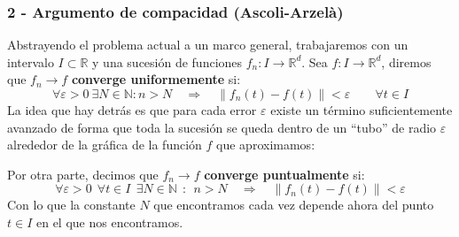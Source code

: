 \subsubsection{2 - Argumento de compacidad (Ascoli-Arzelà)}
\noindent
Abstrayendo el problema actual a un marco general, trabajaremos con un intervalo $I\subset \mathbb{R}$ y una sucesión de funciones $f_n:I\to \mathbb{R}^d$. Sea $f:I\to \mathbb{R}^d$, diremos que $f_n\to f$ \textbf{converge uniformemente} si:
\begin{equation*}
    \forall \varepsilon>0~\exists N\in \mathbb{N} : n>N \quad\Longrightarrow\quad \|f_n(t)-f(t)\| < \varepsilon \qquad \forall t\in I
\end{equation*}
La idea que hay detrás es que para cada error $\varepsilon$ existe un término suficientemente avanzado de forma que toda la sucesión se queda dentro de un ``tubo'' de radio $\varepsilon$ alrededor de la gráfica de la función $f$ que aproximamos:
\begin{figure}[H]
    \centering
\end{figure}
\noindent
Por otra parte, decimos que $f_n\to f$ \textbf{converge puntualmente} si:
\begin{equation*}
    \forall \varepsilon>0~~\forall t\in I~~\exists N\in \mathbb{N}~~:~~n>N \quad\Longrightarrow\quad \|f_n(t)-f(t)\| < \varepsilon 
\end{equation*}
Con lo que la constante $N$ que encontramos cada vez depende ahora del punto $t\in I$ en el que nos encontramos.

